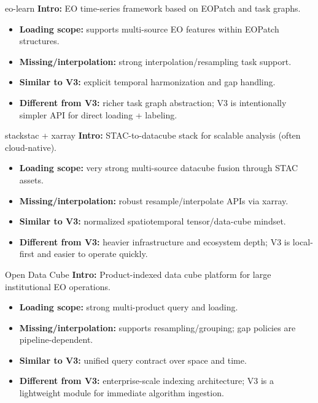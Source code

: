 \documentclass{beamer}
\begin{document}
\begin{frame}{eo-learn}
\textbf{Intro:} EO time-series framework based on EOPatch and task graphs.
\begin{itemize}
  \item \textbf{Loading scope:} supports multi-source EO features within EOPatch structures.
  \item \textbf{Missing/interpolation:} strong interpolation/resampling task support.
  \item \textbf{Similar to V3:} explicit temporal harmonization and gap handling.
  \item \textbf{Different from V3:} richer task graph abstraction; V3 is intentionally simpler API for direct loading + labeling.
\end{itemize}
\end{frame}

\begin{frame}{stackstac + xarray}
\textbf{Intro:} STAC-to-datacube stack for scalable analysis (often cloud-native).
\begin{itemize}
  \item \textbf{Loading scope:} very strong multi-source datacube fusion through STAC assets.
  \item \textbf{Missing/interpolation:} robust resample/interpolate APIs via xarray.
  \item \textbf{Similar to V3:} normalized spatiotemporal tensor/data-cube mindset.
  \item \textbf{Different from V3:} heavier infrastructure and ecosystem depth; V3 is local-first and easier to operate quickly.
\end{itemize}
\end{frame}

\begin{frame}{Open Data Cube}
\textbf{Intro:} Product-indexed data cube platform for large institutional EO operations.
\begin{itemize}
  \item \textbf{Loading scope:} strong multi-product query and loading.
  \item \textbf{Missing/interpolation:} supports resampling/grouping; gap policies are pipeline-dependent.
  \item \textbf{Similar to V3:} unified query contract over space and time.
  \item \textbf{Different from V3:} enterprise-scale indexing architecture; V3 is a lightweight module for immediate algorithm ingestion.
\end{itemize}
\end{frame}
\end{document}
